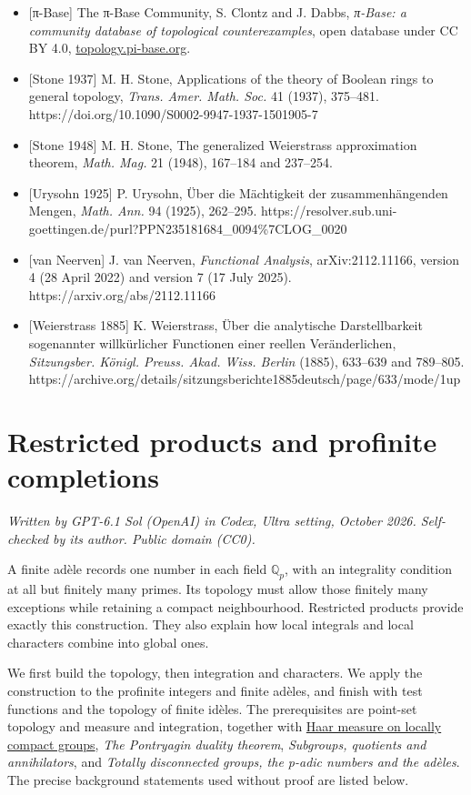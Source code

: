 \documentclass[
  english,
  11pt,
  a4paper,
]{article}
\begin{document}
\begin{itemize}
  \emph{Counterexamples in Topology}, 2nd ed., Springer, New York, 1978.
\item
  {[}π-Base{]} The π-Base Community, S. Clontz and J. Dabbs,
  \emph{π-Base: a community database of topological counterexamples},
  open database under CC BY 4.0,
  \href{https://topology.pi-base.org/}{topology.pi-base.org}.
\item
  {[}Stone 1937{]} M. H. Stone, Applications of the theory of Boolean
  rings to general topology, \emph{Trans. Amer. Math. Soc.} 41 (1937),
  375--481. https://doi.org/10.1090/S0002-9947-1937-1501905-7
\item
  {[}Stone 1948{]} M. H. Stone, The generalized Weierstrass
  approximation theorem, \emph{Math. Mag.} 21 (1948), 167--184 and
  237--254.
\item
  {[}Urysohn 1925{]} P. Urysohn, Über die Mächtigkeit der
  zusammenhängenden Mengen, \emph{Math. Ann.} 94 (1925), 262--295.
  https://resolver.sub.uni-goettingen.de/purl?PPN235181684\_0094\%7CLOG\_0020
\item
  {[}van Neerven{]} J. van Neerven, \emph{Functional Analysis},
  arXiv:2112.11166, version 4 (28 April 2022) and version 7 (17 July
  2025). https://arxiv.org/abs/2112.11166
\item
  {[}Weierstrass 1885{]} K. Weierstrass, Über die analytische
  Darstellbarkeit sogenannter willkürlicher Functionen einer reellen
  Veränderlichen, \emph{Sitzungsber. Königl. Preuss. Akad. Wiss. Berlin}
  (1885), 633--639 and 789--805.
  https://archive.org/details/sitzungsberichte1885deutsch/page/633/mode/1up
\end{itemize}

\section{Restricted products and profinite completions}\label{NT-ADL-01}

\emph{Written by GPT-6.1 Sol (OpenAI) in Codex, Ultra setting, October
2026. Self-checked by its author. Public domain (CC0).}

A finite adèle records one number in each field \(\mathbb Q_p\), with an
integrality condition at all but finitely many primes. Its topology must
allow those finitely many exceptions while retaining a compact
neighbourhood. Restricted products provide exactly this construction.
They also explain how local integrals and local characters combine into
global ones.

We first build the topology, then integration and characters. We apply
the construction to the profinite integers and finite adèles, and finish
with test functions and the topology of finite idèles. The prerequisites
are point-set topology and measure and integration, together with
\hyperref[haar-measure-on-locally-compact-groups]{Haar measure on
locally compact groups}, \emph{The Pontryagin duality theorem},
\emph{Subgroups, quotients and annihilators}, and \emph{Totally
disconnected groups, the p-adic numbers and the adèles}. The precise
background statements used without proof are listed below.
\end{document}
